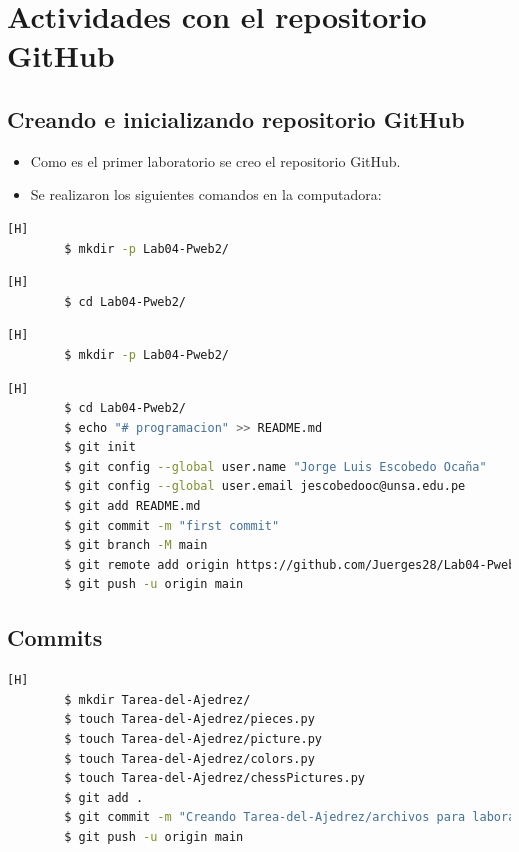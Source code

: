 \documentclass{article}
\begin{document}
	\section{Actividades con el repositorio GitHub}
	
	\subsection{Creando e inicializando repositorio GitHub}
	\begin{itemize}	
		\item Como es el primer laboratorio se creo el repositorio GitHub.
		\item Se realizaron los siguientes comandos en la computadora:
	\end{itemize}	
		
	\begin{lstlisting}[language=bash,caption={Creando directorio de trabajo}][H]
		$ mkdir -p Lab04-Pweb2/
	\end{lstlisting}
	\begin{lstlisting}[language=bash,caption={Dirijíéndonos al directorio de trabajo}][H]
		$ cd Lab04-Pweb2/
	\end{lstlisting}	
	\begin{lstlisting}[language=bash,caption={Creando directorio para repositorio GitHub}][H]
		$ mkdir -p Lab04-Pweb2/
	\end{lstlisting}
	\begin{lstlisting}[language=bash,caption={Inicializando directorio para repositorio GitHub}][H]
		$ cd Lab04-Pweb2/
		$ echo "# programacion" >> README.md
		$ git init
		$ git config --global user.name "Jorge Luis Escobedo Ocaña"
		$ git config --global user.email jescobedooc@unsa.edu.pe
		$ git add README.md
		$ git commit -m "first commit"
		$ git branch -M main
		$ git remote add origin https://github.com/Juerges28/Lab04-Pweb2.git
		$ git push -u origin main
	\end{lstlisting}
	
	\subsection{Commits}
	\begin{lstlisting}[language=bash,caption={Primer Commit Creando carpeta/archivo para laboratorio 01}][H]
        $ mkdir Tarea-del-Ajedrez/
        $ touch Tarea-del-Ajedrez/pieces.py
        $ touch Tarea-del-Ajedrez/picture.py
        $ touch Tarea-del-Ajedrez/colors.py
        $ touch Tarea-del-Ajedrez/chessPictures.py
        $ git add .
        $ git commit -m "Creando Tarea-del-Ajedrez/archivos para laboratorio 04"			
        $ git push -u origin main
	\end{lstlisting}
	
\end{document}
